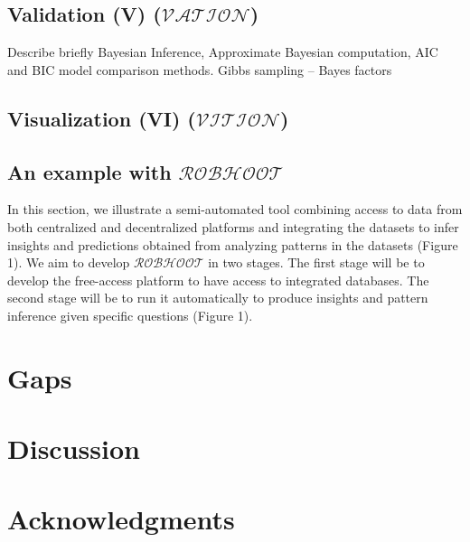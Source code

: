 \documentclass[english,12pt]{article}
\begin{document}
\subsection{Validation (V) ($\mathcal{VATION}$)}

Describe briefly Bayesian Inference, Approximate Bayesian computation,
AIC and BIC model comparison methods.  Gibbs sampling -- Bayes factors


\subsection{Visualization (VI) ($\mathcal{VITION}$)}


\subsection{An example with $\mathcal{ROBHOOT}$}
In this section, we illustrate a semi-automated tool combining access
to data from both centralized and decentralized platforms and
integrating the datasets to infer insights and predictions obtained
from analyzing patterns in the datasets (Figure 1). We aim to develop
$\mathcal{ROBHOOT}$ in two stages. The first stage will be to develop
the free-access platform to have access to integrated databases. The
second stage will be to run it automatically to produce insights and
pattern inference given specific questions (Figure 1).




\section{Gaps}

\section{Discussion}


\newpage
\section{Acknowledgments}


\newpage



\newpage
\end{document}
